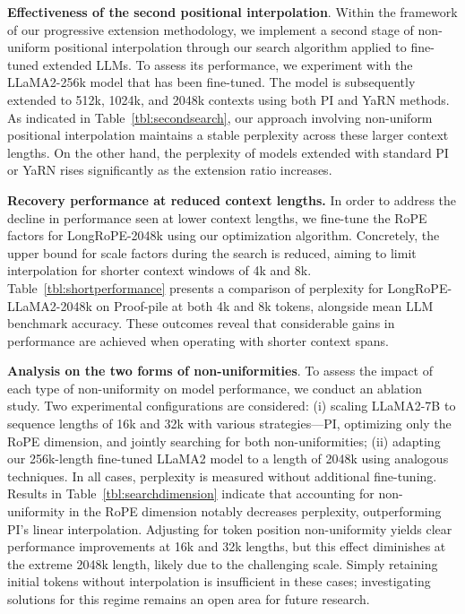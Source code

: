\textbf{Effectiveness of the second positional interpolation}. Within the framework of our progressive extension methodology, we implement a second stage of non-uniform positional interpolation through our search algorithm applied to fine-tuned extended LLMs. To assess its performance, we experiment with the LLaMA2-256k model that has been fine-tuned. The model is subsequently extended to 512k, 1024k, and 2048k contexts using both PI and YaRN methods. As indicated in Table~\ref{tbl:secondsearch}, our approach involving non-uniform positional interpolation maintains a stable perplexity across these larger context lengths. On the other hand, the perplexity of models extended with standard PI or YaRN rises significantly as the extension ratio increases.

\textbf{Recovery performance at reduced context lengths.} In order to address the decline in performance seen at lower context lengths, we fine-tune the RoPE factors for LongRoPE-2048k using our optimization algorithm. Concretely, the upper bound for scale factors during the search is reduced, aiming to limit interpolation for shorter context windows of 4k and 8k. Table~\ref{tbl:shortperformance} presents a comparison of perplexity for LongRoPE-LLaMA2-2048k on Proof-pile at both 4k and 8k tokens, alongside mean LLM benchmark accuracy. These outcomes reveal that considerable gains in performance are achieved when operating with shorter context spans.

\textbf{Analysis on the two forms of non-uniformities}. To assess the impact of each type of non-uniformity on model performance, we conduct an ablation study. Two experimental configurations are considered: (i) scaling LLaMA2-7B to sequence lengths of 16k and 32k with various strategies—PI, optimizing only the RoPE dimension, and jointly searching for both non-uniformities; (ii) adapting our 256k-length fine-tuned LLaMA2 model to a length of 2048k using analogous techniques. In all cases, perplexity is measured without additional fine-tuning. Results in Table~\ref{tbl:searchdimension} indicate that accounting for non-uniformity in the RoPE dimension notably decreases perplexity, outperforming PI’s linear interpolation. Adjusting for token position non-uniformity yields clear performance improvements at 16k and 32k lengths, but this effect diminishes at the extreme 2048k length, likely due to the challenging scale. Simply retaining initial tokens without interpolation is insufficient in these cases; investigating solutions for this regime remains an open area for future research.

